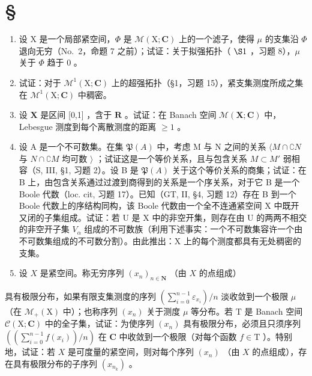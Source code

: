 \section*{\texorpdfstring{\S\CurrentExerciseGroup}{第{\CurrentExerciseGroup}节}}
{}

\begin{enumerate}
\def\labelenumi{\arabic{enumi})}
\item
  设 X 是一个局部紧空间，\(\Phi\) 是 \(\mathcal{M}(\mathrm{X};\mathbf{C})\) 上的一个滤子，使得 \(\mu\) 的支集沿 \(\Phi\) 退向无穷（No.~2，命题 7 之前）；试证：关于拟强拓扑（ \(\S1\) ，习题 8），\(\mu\) 关于 \(\Phi\) 趋于 0 。
\item
  试证：对于 \(\mathcal{M}^1 (\mathrm{X};\mathbf{C})\) 上的超强拓扑（§1，习题 15），紧支集测度所成之集在 \(\mathcal{M}^1 (\mathrm{X};\mathbf{C})\) 中稠密。
\item
  设 \(\mathbf{X}\) 是区间 {[}0,1{]} ，含于 \(\mathbf{R}\) 。试证：在 Banach 空间 \(\mathcal{M}(\mathbf{X};\mathbf{C})\) 中，Lebesgue 测度到每个离散测度的距离 \(\geqslant 1\) 。
\item
  设 A 是一个不可数集。在集 \(\mathfrak{P}(A)\) 中，考虑 M 与 N 之间的关系 \(\langle M \cap \complement N\) 与 \(N \cap \complement M\) 均可数 \(\rangle\) ；试证这是一个等价关系，且与包含关系 \(M \subset M'\) 弱相容（S, III, §1, 习题 2）。设 B 是 \(\mathfrak{P}(A)\) 关于这个等价关系的商集；试证：在 B 上，由包含关系通过过渡到商得到的关系是一个序关系，对于它 B 是一个 Boole 代数（loc. cit, 习题 17）。已知（GT, II, §4, 习题 12）存在 B 到一个 Boole 代数上的序结构同构，该 Boole 代数由一个全不连通紧空间 X 中既开又闭的子集组成。试证：若 U 是 X 中的非空开集，则存在由 U 的两两不相交的非空开子集 \(V_{\alpha}\) 组成的不可数族（利用下述事实：一个不可数集容许一个由不可数集组成的不可数分割）。由此推出：X 上的每个测度都具有无处稠密的支集。
\item
  设 \(X\) 是紧空间。称无穷序列 \((x_{n})_{n\in \mathbf{N}}\) （由 \(X\) 的点组成）
\end{enumerate}

具有极限分布，如果有限支集测度的序列 \(\left(\sum_{i=0}^{n-1} \varepsilon_{x_i}\right)/n\) 淡收敛到一个极限 \(\mu\) （在 \(\mathcal{M}_{+}(\mathrm{X})\) 中）；也称序列 \((x_{n})\) 关于测度 \(\mu\) 等分布。若 \(\mathrm{T}\) 是 Banach 空间 \(\mathcal{C}(\mathrm{X};\mathbf{C})\) 中的全子集，试证：为使序列 \((x_{n})\) 具有极限分布，必须且只须序列 \(\left(\left(\sum_{i=0}^{n-1} f(x_i)\right)/n\right)\) 在 \(\mathbf{C}\) 中收敛到一个极限（对每个函数 \(f \in \mathrm{T}\) ）。特别地，试证：若 \(X\) 是可度量的紧空间，则对每个序列 \((x_{n})\) （由 \(X\) 的点组成），存在具有极限分布的子序列 \((x_{n_k})\) 。

